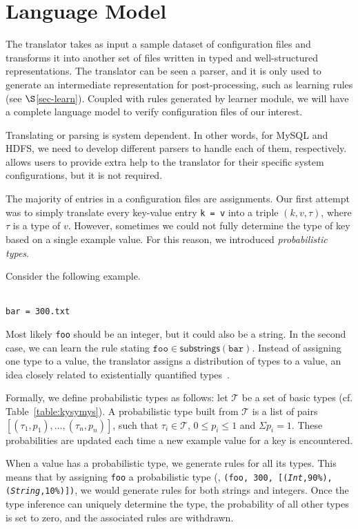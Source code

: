 \section{Language Model}
\label{sec:lang}

The translator takes as input a sample dataset of configuration files and transforms it into another set of files written in
typed and well-structured representations.
The translator can be seen a parser, and it is only
used to generate an intermediate representation for post-processing, 
such as learning rules (see $\S$\ref{sec-learn}).
Coupled with rules generated by learner module,
we will have a complete language model to verify configuration files
of our interest.

Translating or parsing is system dependent. In other words, for MySQL
and HDFS, we need to develop different parsers to handle each of them,
respectively. \app allows users to 
provide extra help to the translator
for their specific system configurations,
but it is not required.

The majority of entries in a configuration files are assignments. Our first attempt was to simply
translate every key-value entry {\tt {k = v}} into a triple $(k, v, \tau)$, where $\tau$ is a type of 
$v$. However, sometimes we could not fully determine the type of key 
based on a single example value. For this reason, we introduced {\emph {probabilistic types}}.

Consider the following example.

\\
{\tt {bar = 300.txt}}

Most likely {\tt foo} should be an integer, but it could also be a string.
In the second case, we can learn the rule stating 
$ \texttt{foo} \in \textsf{substrings}(\texttt{bar})$. 
Instead of assigning one type to a value, the translator assigns a distribution of types 
to a value, an idea closely related to existentially quantified 
types~\cite{Launchbury93lazyfunctional}. 

Formally, we define probabilistic types as follows: let $\mathcal{T}$ be a set of basic types (cf. Table~\ref{table:kysymys}).
A probabilistic type built from $\mathcal{T}$ is a list of pairs 
$[(\tau_1, p_1),\ldots,(\tau_n, p_n)]$,
such that $\tau_i \in \mathcal{T}$, $0 \le p_i \le 1$ 
and $\Sigma p_i = 1$. 
These probabilities are updated each time a new example value 
for a key is encountered.

When a value has a probabilistic type, we generate rules for all its types.
This means that by assigning {\texttt{foo}} a probabilistic type 
(\eg, {\tt (\texttt{foo}, 300, [(\textsl{Int},90\%), 
(\textsl{String},10\%)])},
we would generate rules for both strings and integers.
Once the type inference can uniquely determine the type, 
the probability of all other types is set to zero, 
and the associated rules are withdrawn.

